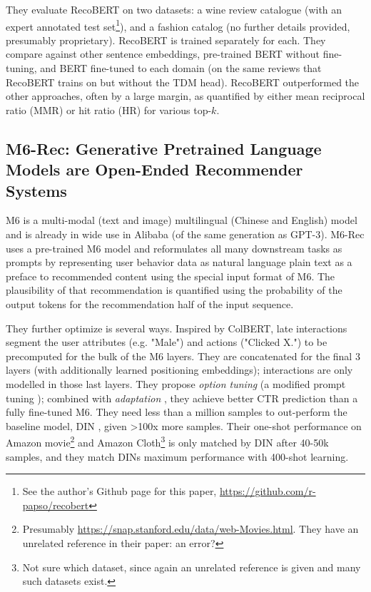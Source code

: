\documentclass[11pt]{article}
\begin{document}
They evaluate RecoBERT on two datasets: a wine review catalogue \cite{kagglewine} (with an expert annotated test set\footnote[2]{See the author's Github page for this paper, \url{https://github.com/r-papso/recobert}}), and a fashion catalog (no further details provided, presumably proprietary). RecoBERT is trained separately for each. They compare against other sentence embeddings, pre-trained BERT without fine-tuning, and BERT fine-tuned to each domain (on the same reviews that RecoBERT trains on but without the TDM head). RecoBERT outperformed the other approaches, often by a large margin, as quantified by either mean reciprocal ratio (MMR) or hit ratio (HR) for various top-$k$. 


\subsection{M6-Rec: Generative Pretrained Language Models are Open-Ended Recommender Systems \cite{Cui2022}}

M6 is a multi-modal (text and image) multilingual (Chinese and English) model and is already in wide use in Alibaba \cite{M6} (of the same generation as GPT-3). M6-Rec uses a pre-trained M6 model and reformulates all many downstream tasks as prompts by representing user behavior data as natural language plain text as a preface to recommended content using the special input format of M6. The plausibility of that recommendation is quantified using the probability of the output tokens for the recommendation half of the input sequence.

They further optimize is several ways. Inspired by ColBERT, late interactions segment the user attributes (e.g. "Male") and actions ("Clicked X.") to be precomputed for the bulk of the M6 layers. They are concatenated for the final 3 layers (with additionally learned positioning embeddings); interactions are only modelled in those last layers. They propose \emph{option tuning} (a modified prompt tuning \cite{PromptTuning}); combined with \emph{adaptation} \cite{Adaptation}, they achieve better CTR prediction than a fully fine-tuned M6. They need less than a million samples to out-perform the baseline model, DIN \cite{DIN}, given >100x more samples. Their one-shot performance on Amazon movie\footnote[3]{Presumably \url{https://snap.stanford.edu/data/web-Movies.html}. They have an unrelated reference in their paper: an error?} and Amazon Cloth\footnote[4]{Not sure which dataset, since again an unrelated reference is given and many such datasets exist.} is only matched by DIN after 40-50k samples, and they match DINs maximum performance with 400-shot learning. 
\end{document}
